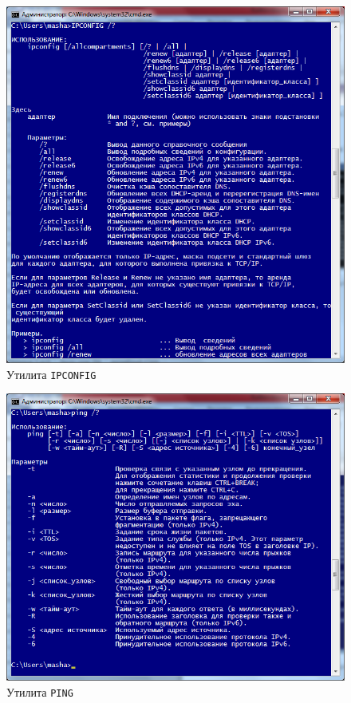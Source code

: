 \begin{figure}[h!]
  \centering
  \includegraphics[width=0.6\linewidth]{pic/ipconfig}
  \caption{Утилита \texttt{IPCONFIG}}
  \label{pic:ipconfig}
\end{figure}

\begin{figure}[h!]
  \centering
  \includegraphics[width=0.7\linewidth]{pic/ping}
  \caption{Утилита \texttt{PING}}
  \label{pic:ping}
\end{figure}

\newpage

